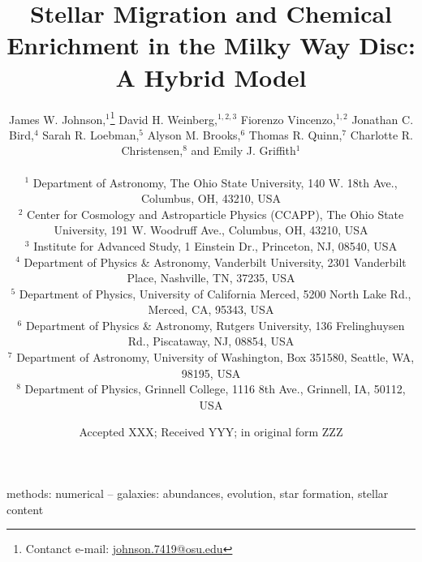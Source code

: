 \documentclass[fleqn, usenatbib]{mnras}
\title[Stellar Migration and Chemical Enrichment]{Stellar Migration and 
Chemical Enrichment in the Milky Way Disc: A Hybrid Model}
\author[J.W. Johnson et al.]{James W. Johnson,$^{1}$\thanks{
	Contanct e-mail: \href{mailto:
	johnson.7419@osu.edu}{johnson.7419@osu.edu}} 
	David H. Weinberg,$^{1, 2, 3}$ 
	Fiorenzo Vincenzo,$^{1, 2}$ 
	Jonathan C. Bird,$^{4}$ 
	\newauthor 
	Sarah R. Loebman,$^{5}$ 
	Alyson M. Brooks,$^{6}$ 
	Thomas R. Quinn,$^{7}$ 
	Charlotte R. Christensen,$^{8}$ 
	\newauthor 
	and Emily J. Griffith$^{1}$ 
	\\ \null \\ 
	$^{1}$ Department of Astronomy, The Ohio State University, 
	140 W. 18th Ave., Columbus, OH, 43210, USA 
	\\ 
	$^{2}$ Center for Cosmology and Astroparticle Physics (CCAPP), 
	The Ohio State University, 191 W. Woodruff Ave., Columbus, OH, 43210, USA 
	\\ 
	$^{3}$ Institute for Advanced Study, 1 Einstein Dr., Princeton, NJ, 08540, 
	USA 
	\\ 
	$^{4}$ Department of Physics \& Astronomy, Vanderbilt University, 
	2301 Vanderbilt Place, Nashville, TN, 37235, USA 
	\\ 
	$^{5}$ Department of Physics, University of California Merced, 
	5200 North Lake Rd., Merced, CA, 95343, USA 
	\\ 
	$^{6}$ Department of Physics \& Astronomy, Rutgers University, 136 
	Frelinghuysen Rd., Piscataway, NJ, 08854, USA 
	\\ 
	$^{7}$ Department of Astronomy, University of Washington, Box 351580, 
	Seattle, WA, 98195, USA 
	\\ 
	$^{8}$ Department of Physics, Grinnell College, 1116 8th Ave., Grinnell, 
	IA, 50112, USA 
}
\date{Accepted XXX; Received YYY; in original form ZZZ}
\begin{document}
 
\label{firstpage} 
\pagerange{\pageref{firstpage}--\pageref{lastpage}} 
\maketitle 

 

\begin{keywords} 
methods: numerical -- galaxies: abundances, evolution, star formation, stellar 
content 
\end{keywords} 

 
 
 
 
 


\begin{appendices} 
 
 
 
\end{appendices} 

 
 

\label{lastpage} 
\end{document}
